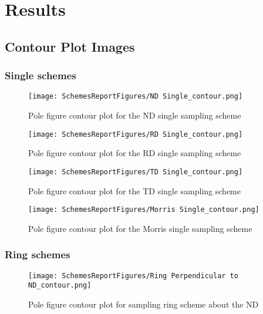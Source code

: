 \documentclass{article}
\begin{document}


\section{Results}



\subsection{Contour Plot Images}

\subsubsection{Single schemes}
\begin{figure}[H]
    \centering
    \texttt{[image: SchemesReportFigures/ND Single\_contour.png]}
    \caption{Pole figure contour plot for the ND single sampling scheme}
\end{figure}

\begin{figure}[H]
    \centering
    \texttt{[image: SchemesReportFigures/RD Single\_contour.png]}
    \caption{Pole figure contour plot for the RD single sampling scheme}
\end{figure}

\begin{figure}[H]
    \centering
    \texttt{[image: SchemesReportFigures/TD Single\_contour.png]}
    \caption{Pole figure contour plot for the TD single sampling scheme}
\end{figure}




\begin{figure}[H]
    \centering
    \texttt{[image: SchemesReportFigures/Morris Single\_contour.png]}
    \caption{Pole figure contour plot for the Morris single sampling scheme}
\end{figure}


\subsubsection{Ring schemes}
\begin{figure}[H]
    \centering
    \texttt{[image: SchemesReportFigures/Ring Perpendicular to ND\_contour.png]}
    \caption{Pole figure contour plot for sampling ring scheme about the ND}
\end{figure}
\end{document}
